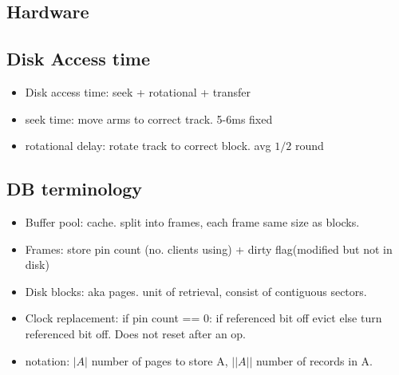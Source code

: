 \documentclass{article}
\begin{document}
\begin{multicols*}{4}

\section{Hardware}
\subsection{Disk Access time}
\begin{itemize}
  \item Disk access time: seek + rotational + transfer
  \item seek time: move arms to correct track. 5-6ms fixed
  \item rotational delay: rotate track to correct block. avg  $1/2$ round 
\end{itemize}

\subsection{DB terminology}
\begin{itemize}
  \item Buffer pool: cache. split into frames, each frame same size as blocks.
  \item Frames: store pin count (no. clients using) + dirty flag(modified but not in disk)
  \item Disk blocks: aka pages. unit of retrieval, consist of contiguous sectors.
  \item Clock replacement: if pin count == 0: if referenced bit off evict else turn referenced bit off. Does not reset after an op.
  \item notation: $|A|$ number of pages to store A, $||A||$ number of records in A.
\end{itemize}


\end{multicols*}
\end{document}
